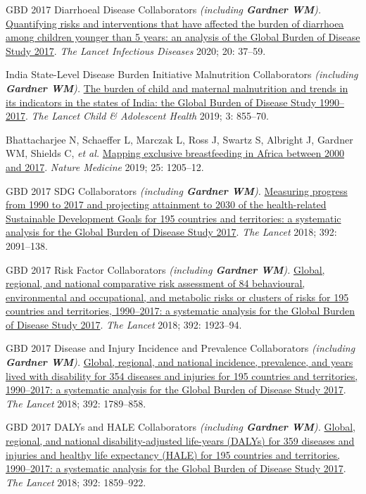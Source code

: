\documentclass[11pt,article,oneside]{memoir}
\begin{document}
\ind GBD 2017 Diarrhoeal Disease Collaborators \emph{(including \textbf{Gardner WM}).} \href{https://doi.org/10.1016/S1473-3099(19)30401-3}{Quantifying risks and interventions that have
affected the burden of diarrhoea among children younger than 5 years: an analysis of the Global Burden of
Disease Study 2017}. \emph{The Lancet Infectious Diseases} 2020; 20: 37--59.

\ind India State-Level Disease Burden Initiative Malnutrition Collaborators \emph{(including \textbf{Gardner WM}).} \href{https://doi.org/10.1016/S2352-4642(19)30273-1}{The burden
of child and maternal malnutrition and trends in its indicators in the states of India: the Global Burden of
Disease Study 1990--2017}. \emph{The Lancet Child \& Adolescent Health} 2019; 3: 855--70.

\ind Bhattacharjee N, Schaeffer L, Marczak L, Ross J, Swartz S, Albright J, {\minbold Gardner WM}, Shields C, \emph{et al.} 
\href{https://doi.org/10.1038/s41591-019-0525-0}{Mapping exclusive breastfeeding in Africa between 2000 and 2017}. \emph{Nature Medicine} 2019; 25: 1205--12.

\ind GBD 2017 SDG Collaborators \emph{(including \textbf{Gardner WM}).} \href{https://doi.org/10.1016/S0140-6736(18)32281-5}{Measuring progress from 1990 to 2017 and
projecting attainment to 2030 of the health-related Sustainable Development Goals for 195 countries and
territories: a systematic analysis for the Global Burden of Disease Study 2017}. \emph{The Lancet} 2018; 392: 2091--138.

\ind GBD 2017 Risk Factor Collaborators \emph{(including \textbf{Gardner WM}).} \href{https://doi.org/10.1016/S0140-6736(18)32225-6}{Global, regional, and national comparative
risk assessment of 84 behavioural, environmental and occupational, and metabolic risks or clusters of risks
for 195 countries and territories, 1990--2017: a systematic analysis for the Global Burden of Disease Study
2017}. \emph{The Lancet} 2018; 392: 1923--94.

\ind GBD 2017 Disease and Injury Incidence and Prevalence Collaborators \emph{(including \textbf{Gardner WM}).} \href{https://doi.org/10.1016/S0140-6736(18)32279-7}{Global, regional, and national incidence,
prevalence, and years lived with disability for 354 diseases and injuries for 195 countries and territories, 1990--2017: a 
systematic analysis for the Global Burden of Disease Study 2017}. \emph{The Lancet} 2018; 392: 1789--858.

\ind GBD 2017 DALYs and HALE Collaborators \emph{(including \textbf{Gardner WM}).} \href{https://doi.org/10.1016/S0140-6736(18)32335-3}{Global, regional, and national disability-adjusted
life-years (DALYs) for 359 diseases and injuries and healthy life expectancy (HALE) for 195 countries and
territories, 1990--2017: a systematic analysis for the Global Burden of Disease Study 2017}. \emph{The Lancet} 2018; 392: 1859--922.
\end{document}
